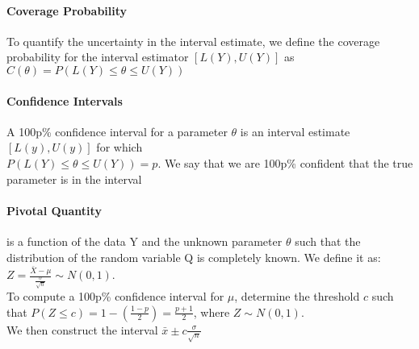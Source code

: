 \documentclass[12pt]{report}
\begin{document}
    \paragraph{Coverage Probability} To quantify the uncertainty in the
    interval estimate, we define the coverage probability for the interval
    estimator $[L(Y), U(Y)]$ as \\
    $C(\theta) = P(L(Y) \leq \theta \leq U(Y))$

    \paragraph{Confidence Intervals} A 100p\% confidence interval for a
    parameter $\theta$ is an interval estimate $[L(y), U(y)]$ for which\\
    $P(L(Y) \leq \theta \leq U(Y)) = p$. We say that we are 100p\% confident
    that the true parameter is in the interval

    \paragraph{Pivotal Quantity} is a function of the data Y and the unknown
    parameter $\theta$ such that the distribution of the random variable Q is
    completely known.  We define it as: $Z = \frac{\bar{X} -
    \mu}{\frac{\sigma}{\sqrt{n}}} \sim N(0, 1)$. \\
    To compute a 100p\% confidence interval for $\mu$, determine the threshold
    $c$ such that $P(Z \leq c) = 1 - (\frac{1-p}{2}) = \frac{p+1}{2}$, where $Z
    \sim N(0, 1)$.\\
    We then construct the interval $\bar{x} \pm c\frac{\sigma}{\sqrt{n}}$
\end{document}
